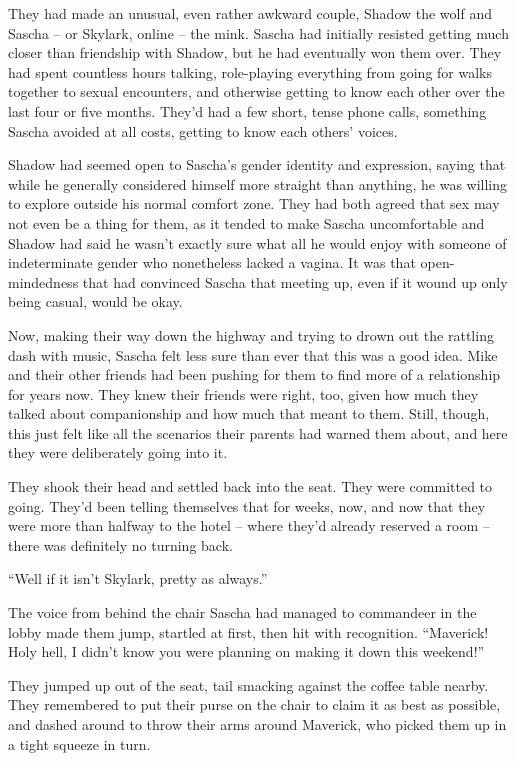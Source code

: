 They had made an unusual, even rather awkward couple, Shadow the wolf and Sascha -- or Skylark, online -- the mink. Sascha had initially resisted getting much closer than friendship with Shadow, but he had eventually won them over. They had spent countless hours talking, role-playing everything from going for walks together to sexual encounters, and otherwise getting to know each other over the last four or five months. They'd had a few short, tense phone calls, something Sascha avoided at all costs, getting to know each others' voices.

Shadow had seemed open to Sascha's gender identity and expression, saying that while he generally considered himself more straight than anything, he was willing to explore outside his normal comfort zone. They had both agreed that sex may not even be a thing for them, as it tended to make Sascha uncomfortable and Shadow had said he wasn't exactly sure what all he would enjoy with someone of indeterminate gender who nonetheless lacked a vagina. It was that open-mindedness that had convinced Sascha that meeting up, even if it wound up only being casual, would be okay.

Now, making their way down the highway and trying to drown out the rattling dash with music, Sascha felt less sure than ever that this was a good idea. Mike and their other friends had been pushing for them to find more of a relationship for years now. They knew their friends were right, too, given how much they talked about companionship and how much that meant to them. Still, though, this just felt like all the scenarios their parents had warned them about, and here they were deliberately going into it.

They shook their head and settled back into the seat. They were committed to going. They'd been telling themselves that for weeks, now, and now that they were more than halfway to the hotel -- where they'd already reserved a room -- there was definitely no turning back.

\secdiv

``Well if it isn't Skylark, pretty as always.''

The voice from behind the chair Sascha had managed to commandeer in the lobby made them jump, startled at first, then hit with recognition. ``Maverick! Holy hell, I didn't know you were planning on making it down this weekend!''

They jumped up out of the seat, tail smacking against the coffee table nearby.  They remembered to put their purse on the chair to claim it as best as possible, and dashed around to throw their arms around Maverick, who picked them up in a tight squeeze in turn.

